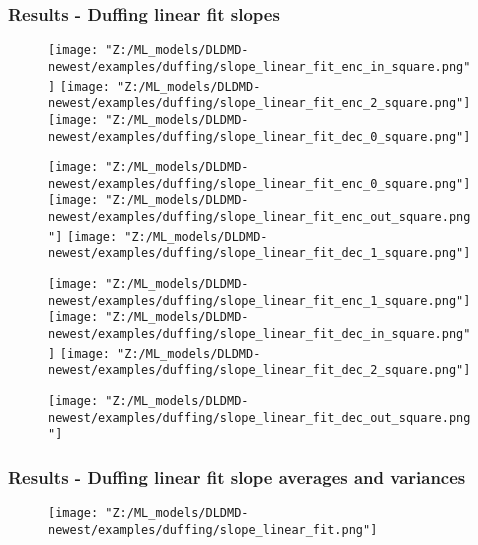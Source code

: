 \documentclass[11pt,aspectratio=169]{beamer}
\begin{document}
    \begin{frame}
        \frametitle{Results - Duffing linear fit slopes}
        \begin{figure}
            \centering
            \begin{minipage}{.3333\textwidth}
                \texttt{[image: "Z:/ML\_models/DLDMD-newest/examples/duffing/slope\_linear\_fit\_enc\_in\_square.png"]}
                \texttt{[image: "Z:/ML\_models/DLDMD-newest/examples/duffing/slope\_linear\_fit\_enc\_2\_square.png"]}
                \texttt{[image: "Z:/ML\_models/DLDMD-newest/examples/duffing/slope\_linear\_fit\_dec\_0\_square.png"]}
            \end{minipage}%
            \begin{minipage}{.3333\textwidth}
                \texttt{[image: "Z:/ML\_models/DLDMD-newest/examples/duffing/slope\_linear\_fit\_enc\_0\_square.png"]}
                \texttt{[image: "Z:/ML\_models/DLDMD-newest/examples/duffing/slope\_linear\_fit\_enc\_out\_square.png"]}
                \texttt{[image: "Z:/ML\_models/DLDMD-newest/examples/duffing/slope\_linear\_fit\_dec\_1\_square.png"]}
            \end{minipage}%
            \begin{minipage}{.3333\textwidth}
                \texttt{[image: "Z:/ML\_models/DLDMD-newest/examples/duffing/slope\_linear\_fit\_enc\_1\_square.png"]}
                \texttt{[image: "Z:/ML\_models/DLDMD-newest/examples/duffing/slope\_linear\_fit\_dec\_in\_square.png"]}
                \texttt{[image: "Z:/ML\_models/DLDMD-newest/examples/duffing/slope\_linear\_fit\_dec\_2\_square.png"]}
            \end{minipage}
            \texttt{[image: "Z:/ML\_models/DLDMD-newest/examples/duffing/slope\_linear\_fit\_dec\_out\_square.png"]}
        \end{figure}
    \end{frame}


    \begin{frame}
        \frametitle{Results - Duffing linear fit slope averages and variances}
        \begin{figure}
            \centering
            \texttt{[image: "Z:/ML\_models/DLDMD-newest/examples/duffing/slope\_linear\_fit.png"]}
        \end{figure}
    \end{frame}
\end{document}
